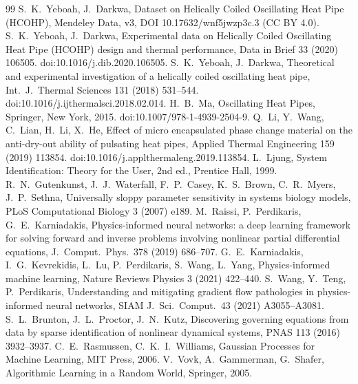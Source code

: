 \begin{thebibliography}{99}\small
{} S.~K.~Yeboah, J.~Darkwa, Dataset on Helically Coiled Oscillating Heat Pipe (HCOHP),
Mendeley Data, v3, DOI 10.17632/wnf5jwzp3c.3 (CC BY 4.0).
 S.~K.~Yeboah, J.~Darkwa, Experimental data on Helically Coiled Oscillating Heat Pipe (HCOHP)
design and thermal performance, Data in Brief 33 (2020) 106505. doi:10.1016/j.dib.2020.106505.
 S.~K.~Yeboah, J.~Darkwa, Theoretical and experimental investigation of a helically coiled
oscillating heat pipe, Int.\ J.\ Thermal Sciences 131 (2018) 531--544. doi:10.1016/j.ijthermalsci.2018.02.014.
 H.~B.~Ma, Oscillating Heat Pipes, Springer, New York, 2015. doi:10.1007/978-1-4939-2504-9.
 Q.~Li, Y.~Wang, C.~Lian, H.~Li, X.~He, Effect of micro encapsulated phase change material on the
anti-dry-out ability of pulsating heat pipes, Applied Thermal Engineering 159 (2019) 113854.
doi:10.1016/j.applthermaleng.2019.113854.
 L.~Ljung, System Identification: Theory for the User, 2nd ed., Prentice Hall, 1999.
 R.~N.~Gutenkunst, J.~J.~Waterfall, F.~P.~Casey, K.~S.~Brown, C.~R.~Myers, J.~P.~Sethna,
Universally sloppy parameter sensitivity in systems biology models, PLoS Computational Biology 3 (2007) e189.
 M.~Raissi, P.~Perdikaris, G.~E.~Karniadakis, Physics-informed neural networks: a deep learning
framework for solving forward and inverse problems involving nonlinear partial differential equations,
J.\ Comput.\ Phys.\ 378 (2019) 686--707.
 G.~E.~Karniadakis, I.~G.~Kevrekidis, L.~Lu, P.~Perdikaris, S.~Wang, L.~Yang,
Physics-informed machine learning, Nature Reviews Physics 3 (2021) 422--440.
 S.~Wang, Y.~Teng, P.~Perdikaris, Understanding and mitigating gradient flow pathologies in
physics-informed neural networks, SIAM J.\ Sci.\ Comput.\ 43 (2021) A3055--A3081.
 S.~L.~Brunton, J.~L.~Proctor, J.~N.~Kutz, Discovering governing equations from data by sparse
identification of nonlinear dynamical systems, PNAS 113 (2016) 3932--3937.
 C.~E.~Rasmussen, C.~K.~I.~Williams, Gaussian Processes for Machine Learning, MIT Press, 2006.
 V.~Vovk, A.~Gammerman, G.~Shafer, Algorithmic Learning in a Random World, Springer, 2005.
\end{thebibliography}
